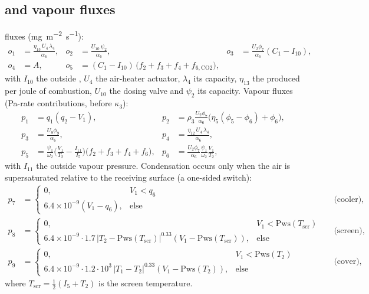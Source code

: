 \documentclass[11pt,a4paper]{article}
\newcommand{\Tcan}{T_{1}}
\newcommand{\Tair}{T_{2}}
\newcommand{\Cair}{C_{1}}
\newcommand{\Vair}{V_{1}}
\begin{document}
\subsection{ and vapour fluxes}\label{sec:co2vap}
 fluxes (\si{mg.m^{-2}.s^{-1}}):
\begin{align}
  o_1 &= \frac{\eta_{13}\,U_4\,\lambda_4}{\alpha_6}, &
  o_2 &= \frac{U_{10}\,\psi_2}{\alpha_6}, &
  o_3 &= \frac{U_2\phi_7}{\alpha_6}(\Cair-I_{10}),\\
  o_4 &= A, &
  o_5 &= (\Cair-I_{10})\,\big(f_2+f_3+f_4+f_{6,\text{CO2}}\big), &&
\end{align}
with $I_{10}$ the outside , $U_4$ the air-heater actuator, $\lambda_4$ its capacity,
$\eta_{13}$ the  produced per joule of combustion, $U_{10}$ the dosing valve and $\psi_2$
its capacity. Vapour fluxes (\si{Pa}-rate contributions, before $\kappa_3$):
\begin{align}
  p_1 &= q_1(q_2-\Vair), & p_2 &= \rho_3\frac{U_2\phi_7}{\alpha_6}\big(\eta_5(\phi_5-\phi_6)+\phi_6\big),\\
  p_3 &= \frac{U_9\phi_9}{\alpha_6}, & p_4 &= \frac{\eta_{12}\,U_4\,\lambda_4}{\alpha_6},\\
  p_5 &= \frac{\psi_1}{\omega_2}\Big(\frac{\Vair}{\Tair}-\frac{I_{11}}{I_5}\Big)\big(f_2+f_3+f_4+f_6\big),
      & p_6 &= \frac{U_2\phi_7}{\alpha_6}\frac{\psi_1}{\omega_2}\frac{\Vair}{\Tair},
\end{align}
with $I_{11}$ the outside vapour pressure. Condensation occurs only when the air is supersaturated
relative to the receiving surface (a one-sided switch):
\begin{align}
  p_7 &= \begin{cases}0,&\Vair<q_6\\ 6.4\!\times\!10^{-9}(\Vair-q_6),&\text{else}\end{cases} &&\text{(cooler)},\\
  p_8 &= \begin{cases}0,&\Vair<\mathrm{Pws}(T_{\text{scr}})\\ 6.4\!\times\!10^{-9}\!\cdot\!1.7\,|\Tair-\mathrm{Pws}(T_{\text{scr}})|^{0.33}(\Vair-\mathrm{Pws}(T_{\text{scr}})),&\text{else}\end{cases} &&\text{(screen)},\\
  p_9 &= \begin{cases}0,&\Vair<\mathrm{Pws}(\Tair)\\ 6.4\!\times\!10^{-9}\!\cdot\!1.2\!\cdot\!10^{3}\,|\Tcan-\Tair|^{0.33}(\Vair-\mathrm{Pws}(\Tair)),&\text{else}\end{cases} &&\text{(cover)},
\end{align}
where $T_{\text{scr}}=\tfrac12(I_5+\Tair)$ is the screen temperature.
\end{document}
